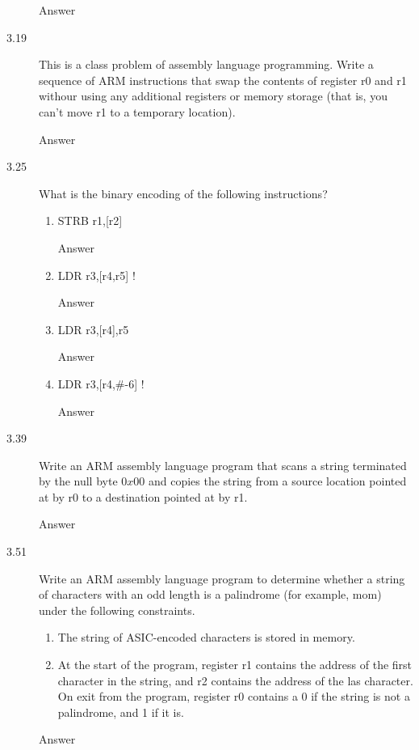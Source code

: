 \documentclass[letterpaper,10pt,titlepage]{article}
\begin{document}
\begin{description}
    Answer
    \item[3.19] This is a class problem of assembly language programming. Write a sequence of ARM instructions that swap the contents of register r0 and r1 withour using any additional registers or memory storage (that is, you can't move r1 to a temporary location).
    
    Answer
    \item[3.25] What is the binary encoding of the following instructions?
    \begin{enumerate}
        \item STRB r1,[r2]
        
        Answer
        \item LDR r3,[r4,r5] !
        
        Answer
        \item LDR r3,[r4],r5
        
        Answer
        \item LDR r3,[r4,#-6] !
        
        Answer
    \end{enumerate}
    \item[3.39] Write an ARM assembly language program that scans a string terminated by the null byte $0x00$ and copies the string from a source location pointed at by r0 to a destination pointed at by r1.
    
    Answer
    \item[3.51] Write an ARM assembly language program to determine whether a string of characters with an odd length is a palindrome (for example, mom) under the following constraints.
    \begin{enumerate}
        \item The string of ASIC-encoded characters is stored in memory.
        \item At the start of the program, register r1 contains the address of the first character in the string, and r2 contains the address of the las character. On exit from the program, register r0 contains a 0 if the string is not a palindrome, and 1 if it is.
    \end{enumerate}
    
    Answer
\end{description}

%
\end{document}
